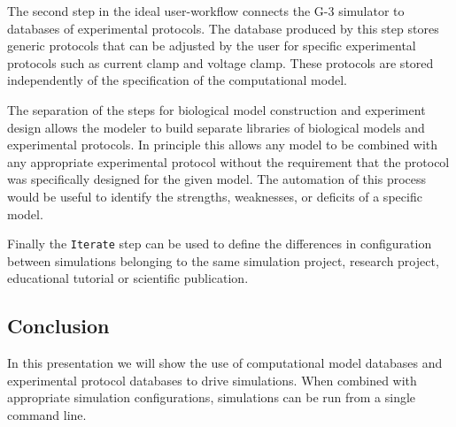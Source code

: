 \documentclass[12pt]{article}
\begin{document}
The second step in the ideal user-workflow connects the G-3 simulator
to databases of experimental protocols.  The database produced by this
step stores generic protocols that can be adjusted by the user for
specific experimental protocols such as current clamp and voltage
clamp.  These protocols are stored independently of the specification
of the computational model.

The separation of the steps for biological model construction and
experiment design allows the modeler to build separate libraries of
biological models and experimental protocols.  In principle this
allows any model to be combined with any appropriate experimental
protocol without the requirement that the protocol was specifically
designed for the given model.  The automation of this process would be
useful to identify the strengths, weaknesses, or deficits of a
specific model.

Finally the {\tt Iterate} step can be used to define the differences
in configuration between simulations belonging to the same simulation
project, research project, educational tutorial or scientific
publication.

\subsection*{Conclusion}

In this presentation we will show the use of computational model
databases and experimental protocol databases to drive simulations.
When combined with appropriate simulation configurations, simulations
can be run from a single command line.
\end{document}
